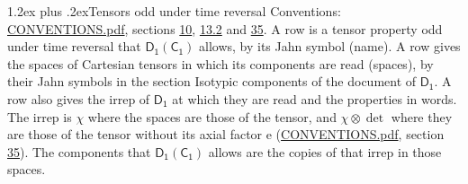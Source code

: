 \documentclass[10pt,a4paper]{article}
\makeatletter
\renewcommand\section{\@startsection{section}{1}{\z@}{-3ex plus -1ex minus -.2ex}%
  {1.2ex plus .2ex}{\normalfont\large\sffamily\bfseries\color{parttitle}}}
\numberwithin{equation}{section}
\newcommand{\grp}[1]{\mathsf{#1}}
\newcommand{\irrprod}{\otimes}
\makeatother
\begin{document}
\section{Tensors odd under time reversal}\label{s:time_odd}
Conventions: \href{../../CONVENTIONS.pdf}{CONVENTIONS.pdf}, sections \href{../../../rotation/CONVENTIONS.pdf\#conv.10}{10}, \href{../../../rotation/CONVENTIONS.pdf\#conv.13.2}{13.2} and \href{../../CONVENTIONS.pdf\#conv.35}{35}.
\leavevmode\label{n:head.name.property}A row is a tensor property odd under time reversal that $\grp{D_{1}}(\grp{C_{1}})$ allows, by its Jahn symbol (name). \label{n:head.spaces}A row gives the spaces of Cartesian tensors in which its components are read (spaces), by their Jahn symbols in the section Isotypic components of the document of \href{../../../rotation/data/pdf/D1.pdf}{$\grp{D_{1}}$}. \label{n:head.properties}A row also gives the irrep of $\grp{D_{1}}$ at which they are read and the properties in words. The irrep is $\chi$ where the spaces are those of the tensor, and $\chi \irrprod \det$ where they are those of the tensor without its axial factor e (\href{../../CONVENTIONS.pdf}{CONVENTIONS.pdf}, section \href{../../CONVENTIONS.pdf\#conv.35}{35}). The components that $\grp{D_{1}}(\grp{C_{1}})$ allows are the copies of that irrep in those spaces.
\end{document}
